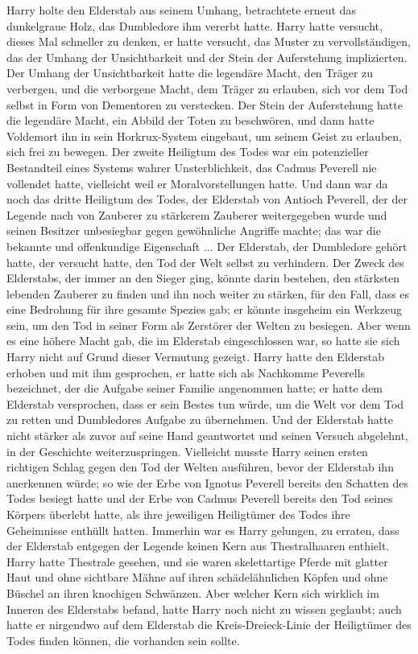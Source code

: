 Harry holte den Elderstab aus seinem Umhang, betrachtete erneut das dunkelgraue
Holz, das Dumbledore ihm vererbt hatte. Harry hatte versucht, dieses Mal
schneller zu denken, er hatte versucht, das Muster zu vervollständigen, das der
Umhang der Unsichtbarkeit und der Stein der Auferstehung implizierten. Der
Umhang der Unsichtbarkeit hatte die legendäre Macht, den Träger zu verbergen,
und die verborgene Macht, dem Träger zu erlauben, sich vor dem Tod selbst in
Form von Dementoren zu verstecken. Der Stein der Auferstehung hatte die
legendäre Macht, ein Abbild der Toten zu beschwören, und dann hatte Voldemort
ihn in sein Horkrux-System eingebaut, um seinem Geist zu erlauben, sich frei zu
bewegen. Der zweite Heiligtum des Todes war ein potenzieller Bestandteil eines
Systems wahrer Unsterblichkeit, das Cadmus Peverell nie vollendet hatte,
vielleicht weil er Moralvorstellungen hatte. Und dann war da noch das dritte
Heiligtum des Todes, der Elderstab von Antioch Peverell, der der Legende nach
von Zauberer zu stärkerem Zauberer weitergegeben wurde und seinen Besitzer
unbesiegbar gegen gewöhnliche Angriffe machte; das war die bekannte und
offenkundige Eigenschaft ... Der Elderstab, der Dumbledore gehört hatte, der
versucht hatte, den Tod der Welt selbst zu verhindern. Der Zweck des Elderstabs,
der immer an den Sieger ging, könnte darin bestehen, den stärksten lebenden
Zauberer zu finden und ihn noch weiter zu stärken, für den Fall, dass es eine
Bedrohung für ihre gesamte Spezies gab; er könnte insgeheim ein Werkzeug sein,
um den Tod in seiner Form als Zerstörer der Welten zu besiegen. Aber wenn es
eine höhere Macht gab, die im Elderstab eingeschlossen war, so hatte sie sich
Harry nicht auf Grund dieser Vermutung gezeigt. Harry hatte den Elderstab
erhoben und mit ihm gesprochen, er hatte sich als Nachkomme Peverells
bezeichnet, der die Aufgabe seiner Familie angenommen hatte; er hatte dem
Elderstab versprochen, dass er sein Bestes tun würde, um die Welt vor dem Tod zu
retten und Dumbledores Aufgabe zu übernehmen. Und der Elderstab hatte nicht
stärker als zuvor auf seine Hand geantwortet und seinen Versuch abgelehnt, in
der Geschichte weiterzuspringen. Vielleicht musste Harry seinen ersten richtigen
Schlag gegen den Tod der Welten ausführen, bevor der Elderstab ihn anerkennen
würde; so wie der Erbe von Ignotus Peverell bereits den Schatten des Todes
besiegt hatte und der Erbe von Cadmus Peverell bereits den Tod seines Körpers
überlebt hatte, als ihre jeweiligen Heiligtümer des Todes ihre Geheimnisse
enthüllt hatten. Immerhin war es Harry gelungen, zu erraten, dass der Elderstab
entgegen der Legende keinen Kern aus \glqq{}Thestralhaaren\grqq{} enthielt. Harry
hatte Thestrale gesehen, und sie waren skelettartige Pferde mit glatter Haut und
ohne sichtbare Mähne auf ihren schädelähnlichen Köpfen und ohne Büschel an ihren
knochigen Schwänzen. Aber welcher Kern sich wirklich im Inneren des Elderstabs
befand, hatte Harry noch nicht zu wissen geglaubt; auch hatte er nirgendwo auf
dem Elderstab die Kreis-Dreieck-Linie der Heiligtümer des Todes finden können,
die vorhanden sein sollte.

